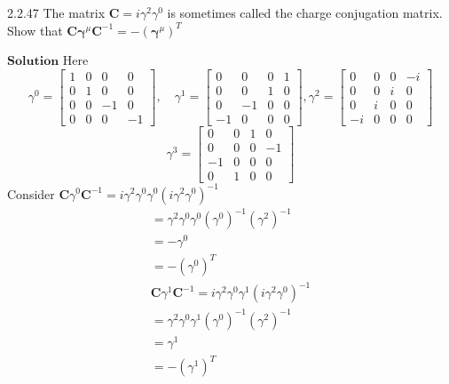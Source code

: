 \begin{mybox}{2.2.47}
The matrix $\mathbf{C}=i \gamma^{2} \gamma^{0}$ is sometimes called the charge conjugation matrix. Show that $\mathbf{C} \boldsymbol{\gamma}^{\mu} \mathbf{C}^{-1}=-\left(\boldsymbol{\gamma}^{\mu}\right)^{T}$
\end{mybox}
$\boxed{\textbf{Solution}}$ Here
$$
\gamma^{0}=\begin{bmatrix}
1 & 0 & 0 & 0 \\
0 & 1 & 0 & 0 \\
0 & 0 & -1 & 0 \\
0 & 0 & 0 & -1
\end{bmatrix}, \quad \gamma^{1}=\begin{bmatrix}
0 & 0 & 0 & 1 \\
0 & 0 & 1 & 0 \\
0 & -1 & 0 & 0 \\
-1 & 0 & 0 & 0
\end{bmatrix}, \gamma^{2}=\begin{bmatrix}
0 & 0 & 0 & -i \\
0 & 0 & i & 0 \\
0 & i & 0 & 0 \\
-i & 0 & 0 & 0
\end{bmatrix}
$$
$$
\gamma^{3}=\begin{bmatrix}
0 & 0 & 1 & 0 \\
0 & 0 & 0 & -1 \\
-1 & 0 & 0 & 0 \\
0 & 1 & 0 & 0
\end{bmatrix}
$$
Consider $\mathbf{C} \gamma^{0} \mathbf{C}^{-1}=i \gamma^{2} \gamma^{0} \gamma^{0}\left(i \gamma^{2} \gamma^{0}\right)^{-1}$
$$
\begin{array}{l}
=\gamma^{2} \gamma^{0} \gamma^{0}\left(\gamma^{0}\right)^{-1}\left(\gamma^{2}\right)^{-1} \\
=-\gamma^{0} \\
=-\left(\gamma^{0}\right)^{T} \\
\mathbf{C} \gamma^{1} \mathbf{C}^{-1}=i \gamma^{2} \gamma^{0} \gamma^{1}\left(i \gamma^{2} \gamma^{0}\right)^{-1} \\
=\gamma^{2} \gamma^{0} \gamma^{1}\left(\gamma^{0}\right)^{-1}\left(\gamma^{2}\right)^{-1} \\
=\gamma^{1} \\
=-\left(\gamma^{1}\right)^{T}
\end{array}
$$
